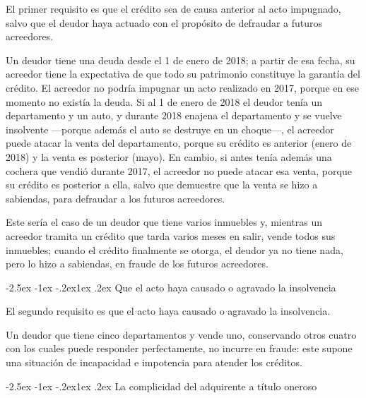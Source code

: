 \documentclass[12pt,oneside]{book}
\makeatletter
\renewcommand\subsection{\@startsection{subsection}{2}{\z@}%
  {-2.5ex \@plus -1ex \@minus -.2ex}{1ex \@plus .2ex}%
  {\normalfont\normalsize\bfseries}}
\makeatother
\begin{document}
El primer requisito es que el crédito sea de causa anterior al acto impugnado, salvo que el deudor haya actuado con el propósito de defraudar a futuros acreedores.

\begin{ejemplo}
Un deudor tiene una deuda desde el 1 de enero de 2018; a partir de esa fecha, su acreedor tiene la expectativa de que todo su patrimonio constituye la garantía del crédito. El acreedor no podría impugnar un acto realizado en 2017, porque en ese momento no existía la deuda. Si al 1 de enero de 2018 el deudor tenía un departamento y un auto, y durante 2018 enajena el departamento y se vuelve insolvente ---porque además el auto se destruye en un choque---, el acreedor puede atacar la venta del departamento, porque su crédito es anterior (enero de 2018) y la venta es posterior (mayo). En cambio, si antes tenía además una cochera que vendió durante 2017, el acreedor no puede atacar esa venta, porque su crédito es posterior a ella, salvo que demuestre que la venta se hizo a sabiendas, para defraudar a los futuros acreedores.

Este sería el caso de un deudor que tiene varios inmuebles y, mientras un acreedor tramita un crédito que tarda varios meses en salir, vende todos sus inmuebles; cuando el crédito finalmente se otorga, el deudor ya no tiene nada, pero lo hizo a sabiendas, en fraude de los futuros acreedores.
\end{ejemplo}

\subsection{Que el acto haya causado o agravado la insolvencia}

El segundo requisito es que el acto haya causado o agravado la insolvencia.

\begin{ejemplo}
Un deudor que tiene cinco departamentos y vende uno, conservando otros cuatro con los cuales puede responder perfectamente, no incurre en fraude: este supone una situación de incapacidad e impotencia para atender los créditos.
\end{ejemplo}

\subsection{La complicidad del adquirente a título oneroso}
\end{document}
